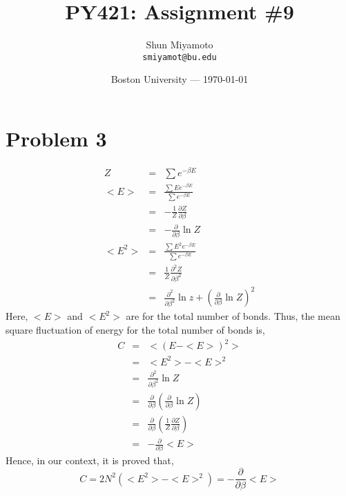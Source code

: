 \documentclass{article}
\title{PY421: Assignment \#9} %
\author{Shun Miyamoto\\ \texttt{smiyamot@bu.edu}} %
\date{Boston University --- \today} %
\begin{document}
\maketitle %




\section{Problem 3} %
\begin{eqnarray}
Z &=& \sum e^{-\beta E} \\
<E> &=& \frac{\sum E e^{-\beta E}}{\sum e^{-\beta E}} \nonumber \\
&=& -\frac{1}{Z} \frac{\partial Z}{\partial \beta} \\
&=& -\frac{\partial}{\partial \beta} \ln Z \\
<E^2> &=& \frac{\sum E^2 e^{-\beta E}}{\sum e^{-\beta E}} \nonumber \\
&=& \frac{1}{Z} \frac{\partial ^2 Z}{\partial \beta ^2} \nonumber \\
&=& \frac{\partial ^2}{\partial \beta ^2} \ln z + (\frac{\partial}{\partial \beta} \ln Z) ^2
\end{eqnarray}
Here, $<E>$ and $<E^2>$ are for the total number of bonds. Thus, the mean square fluctuation of energy for the total number of bonds is,
\begin{eqnarray}
C &=& <(E-<E>)^2> \nonumber \\
&=&<E^2> - <E>^2 \nonumber \\
&=& \frac{\partial ^2}{\partial \beta ^2} \ln Z \nonumber \\
&=& \frac{\partial}{\partial \beta}(\frac{\partial}{\partial \beta} \ln Z) \nonumber \\
&=&\frac{\partial}{\partial \beta} (\frac{1}{Z}\frac{\partial Z}{\partial \beta}) \nonumber \\
&=& -\frac{\partial}{\partial \beta} <E>
\end{eqnarray}
Hence, in our context, it is proved that,
\begin{equation}
C = 2N^2(<E^2> - <E>^2) = -\frac{\partial}{\partial \beta} <E>
\end{equation}
\end{document}
